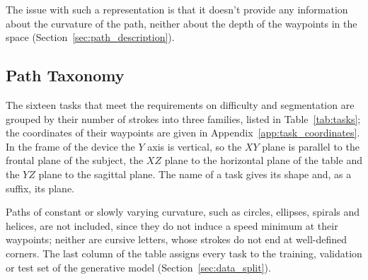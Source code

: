 \documentclass[12pt]{report}
\begin{document}
The issue with such a representation is that it doesn't provide any information about the curvature of the path, neither about the depth of the waypoints in the space (Section~\ref{sec:path_description}).

\subsection{Path Taxonomy}
The sixteen tasks that meet the requirements on difficulty and segmentation are grouped by their number of strokes into three families, listed in Table~\ref{tab:tasks}; the coordinates of their waypoints are given in Appendix~\ref{app:task_coordinates}. In the frame of the device the $Y$ axis is vertical, so the $XY$ plane is parallel to the frontal plane of the subject, the $XZ$ plane to the horizontal plane of the table and the $YZ$ plane to the sagittal plane. The name of a task gives its shape and, as a suffix, its plane.

Paths of constant or slowly varying curvature, such as circles, ellipses, spirals and helices, are not included, since they do not induce a speed minimum at their waypoints; neither are cursive letters, whose strokes do not end at well-defined corners. The last column of the table assigns every task to the training, validation or test set of the generative model (Section~\ref{sec:data_split}).
\end{document}
